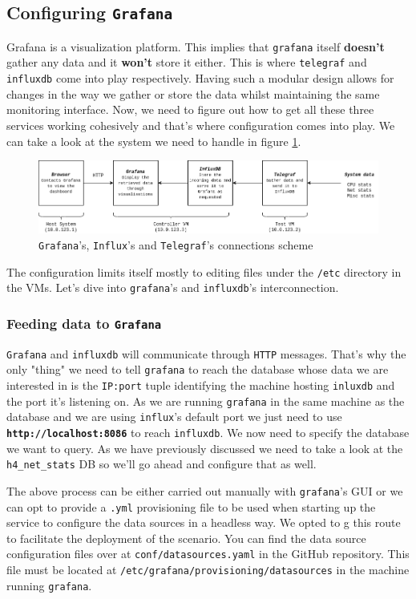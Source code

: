 \documentclass[12pt]{article}
\newcommand{\newpar} {
    \vskip 1cm
}
\begin{document}
	\subsection{Configuring \texttt{Grafana}}
		Grafana is a visualization platform. This implies that \texttt{grafana} itself \textbf{doesn't} gather any data and it \textbf{won't} store it either. This is where \texttt{telegraf} and \texttt{influxdb} come into play respectively. Having such a modular design allows for changes in the way we gather or store the data whilst maintaining the same monitoring interface. Now, we need to figure out how to get all these three services working cohesively and that's where configuration comes into play. We can take a look at the system we need to handle in figure \ref{f:g_i_t}.

		\begin{figure}
			\centering
			\includegraphics[width=\linewidth]{g_i_t.png}
			\caption{\texttt{Grafana}'s, \texttt{Influx}'s and \texttt{Telegraf}'s connections scheme}
			\label{f:g_i_t}
		\end{figure}

		The configuration limits itself mostly to editing files under the \texttt{/etc} directory in the VMs. Let's dive into \texttt{grafana}'s and \texttt{influxdb}'s interconnection.

		\subsubsection{Feeding data to \texttt{Grafana}}
			\texttt{Grafana} and \texttt{influxdb} will communicate through \texttt{HTTP} messages. That's why the only "thing" we need to tell \texttt{grafana} to reach the database whose data we are interested in is the \texttt{IP:port} tuple identifying the machine hosting \texttt{inluxdb} and the port it's listening on. As we are running \texttt{grafana} in the same machine as the database and we are using \texttt{influx}'s default port we just need to use \textbf{\texttt{http://localhost:8086}} to reach \texttt{influxdb}. We now need to specify the database we want to query. As we have previously discussed we need to take a look at the \texttt{h4\_net\_stats} DB so we'll go ahead and configure that as well.
			\newpar
			The above process can be either carried out manually with \texttt{grafana}'s GUI or we can opt to provide a \texttt{.yml} provisioning file to be used when starting up the service to configure the data sources in a headless way. We opted to g this route to facilitate the deployment of the scenario. You can find the data source configuration files over at \texttt{conf/datasources.yaml} in the GitHub repository. This file must be located at \texttt{/etc/grafana/provisioning/datasources} in the machine running \texttt{grafana}.
\end{document}
